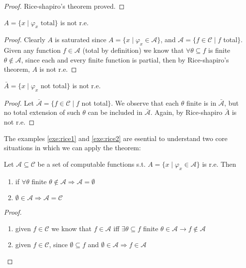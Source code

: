 \begin{theorem}
\begin{proof}
  Rice-shapiro's theorem proved.
\end{proof}
\end{theorem}

\begin{example}\label{exe:rice1}
  $A = \{ x \mid \varphi_x \mbox{ total}\}$ is not r.e.

  \begin{proof}
    Clearly $A$ is saturated since $A = \{x \mid \varphi_x \in
    \mathcal{A}\}$, and $\mathcal{A} = \{f \in \mathcal{C} \mid f $ total$\}$. 
    Given any function $f \in \mathcal{A}$ (total by
    definition) we know that $\forall \theta \subseteq f$
    is finite $\theta \notin \mathcal{A}$, since each and every finite
    function is partial, then by Rice-shapiro's theorem, $A$ is
    not r.e.
  \end{proof}
\end{example}

\begin{example}\label{exe:rice2}
  $\bar{A} = \{x \mid \varphi_x $ not total$\}$ is not r.e.

  \begin{proof}
    Let $\bar{\mathcal{A}} = \{f \in \mathcal{C} \mid f $ not total$\}$. We observe that each $\theta$ finite is in
    $\bar{\mathcal{A}}$, but no total extension of such $\theta$ can
    be included in $\bar{\mathcal{A}}$. Again, by Rice-shapiro
    $\bar{A}$ is not r.e.
  \end{proof}
\end{example}

The examples \ref{exe:rice1} and \ref{exe:rice2} are esential to
understand two core situations in which we can apply the theorem:
\begin{observation}
  Let $\mathcal{A} \subseteq \mathcal{C}$ be a set of computable
  functions s.t. $A = \{ x \mid \varphi_x \in \mathcal{A}\}$ is
  r.e. Then
  \begin{enumerate}[label=(i)]
  \item if \(\forall \theta \) finite
    \( \theta \notin \mathcal{A} \Rightarrow \mathcal{A} = \emptyset\)
  \item
    \(\emptyset \in \mathcal{A} \Rightarrow \mathcal{A} =
    \mathcal{C}\)
  \end{enumerate}

  \begin{proof}
    \begin{enumerate}[label=(i)]
    \item given $f \in \mathcal{C}$ we know that $f \in \mathcal{A}$
      iff $\exists \theta \subseteq f$ finite
      $\theta \in \mathcal{A} \rightarrow f \notin \mathcal{A}$
    \item given $f \in \mathcal{C}$, since $\emptyset \subseteq f$ and
      $\emptyset \in \mathcal{A} \Rightarrow f \in \mathcal{A}$
    \end{enumerate}
  \end{proof}
\end{observation}

